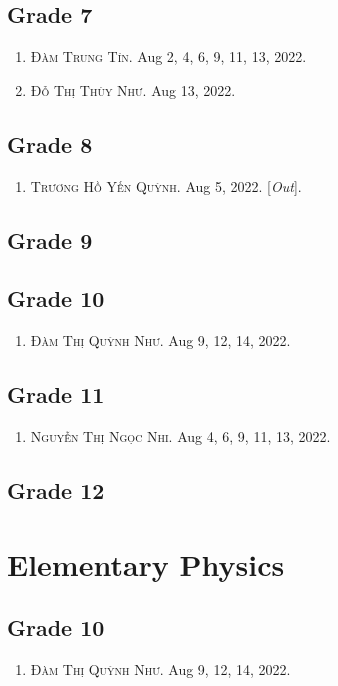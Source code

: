 \documentclass{article}
\numberwithin{equation}{section}
\begin{document}
\subsection{Grade 7}
\begin{enumerate}
	\item \textsc{Đàm Trung Tín.} Aug 2, 4, 6, 9, 11, 13, 2022.
	\item \textsc{Đỗ Thị Thùy Như.} Aug 13, 2022.
\end{enumerate}

\subsection{Grade 8}
\begin{enumerate}
	\item \textsc{Trương Hồ Yến Quỳnh.} Aug 5, 2022. [\textit{Out}].
\end{enumerate}

\subsection{Grade 9}

\subsection{Grade 10}
\begin{enumerate}
	\item \textsc{Đàm Thị Quỳnh Như.} Aug 9, 12, 14, 2022.
\end{enumerate}

\subsection{Grade 11}
\begin{enumerate}
	\item \textsc{Nguyễn Thị Ngọc Nhi.} Aug 4, 6, 9, 11, 13, 2022.
\end{enumerate}

\subsection{Grade 12}

\section{Elementary Physics}

\subsection{Grade 10}
\begin{enumerate}
	\item \textsc{Đàm Thị Quỳnh Như.} Aug 9, 12, 14, 2022.
\end{enumerate}
\end{document}
